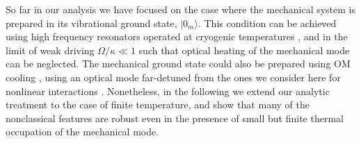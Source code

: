 So far in our analysis
we have focused on the case where the mechanical
system is prepared in its vibrational 
ground state, $|0_m\rangle$. 
This
condition can be achieved using high frequency resonators 
operated at cryogenic
temperatures \cite{O'Connell2010}, 
and in the limit of weak driving $\Omega/\kappa\ll1$ such
that optical
heating of the mechanical mode can be neglected. 
The mechanical ground state  could also be 
prepared using OM cooling \cite{Metzger2004, Gigan2006, 
Arcizet2006, Kleckner2006, Corbitt2007, 
Schliesser2008,Thompson2008,Wilson2009,
O'Connell2010,Teufel2011,Chan2011},
using an optical mode far-detuned
from the ones we consider  here for 
nonlinear interactions
\cite{Stannigel2012}.
Nonetheless,
in the
following we extend our analytic treatment to the case of finite temperature, 
and show that many of the
nonclassical features are robust even
in the presence of small
but finite thermal occupation of the mechanical mode.


